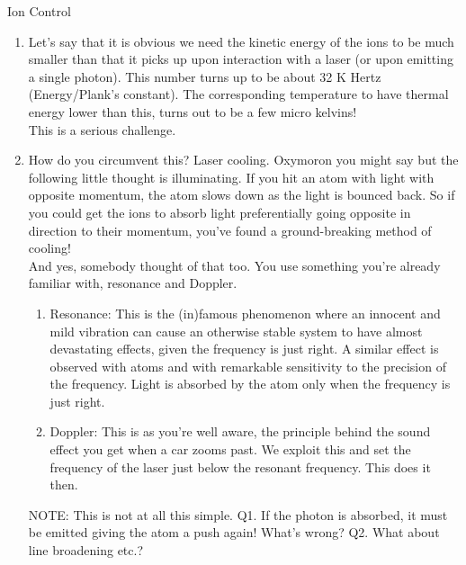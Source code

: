 \documentclass[final,hyperref={pdfpagelabels=false}]{beamer}
\begin{document}
\begin{frame}[t]
\begin{columns}[t]
\begin{column}{.465\textwidth}
\begin{block}{Ion Control}
	\begin{enumerate}
		\item Let's say that it is obvious we need the kinetic energy of the ions
		to be much smaller than that it picks up upon interaction with a laser
		(or upon emitting a single photon). This number turns up to be about
		32 K Hertz (Energy/Plank's constant). The corresponding temperature
		to have thermal energy lower than this, turns out to be a few micro
		kelvins!\\
		This is a serious challenge.
		\item How do you circumvent this? Laser cooling. Oxymoron you might say
		but the following little thought is illuminating. If you hit an atom
		with light with opposite momentum, the atom slows down as the light
		is bounced back. So if you could get the ions to absorb light preferentially
		going opposite in direction to their momentum, you've found a ground-breaking
		method of cooling!\\
		And yes, somebody thought of that too. You use something you're already
		familiar with, resonance and Doppler.

		\begin{enumerate}
			\item Resonance: This is the (in)famous phenomenon where an innocent and
			mild vibration can cause an otherwise stable system to have almost
			devastating effects, given the frequency is just right. A similar
			effect is observed with atoms and with remarkable sensitivity to the
			precision of the frequency. Light is absorbed by the atom only when
			the frequency is just right.
			\item Doppler: This is as you're well aware, the principle behind the sound
			effect you get when a car zooms past. We exploit this and set the
			frequency of the laser just below the resonant frequency. This does
			it then.\\		
		\end{enumerate}
		NOTE: This is not at all this simple. Q1. If the photon is absorbed,
		it must be emitted giving the atom a push again! What's wrong? Q2.
		What about line broadening etc.?		
	\end{enumerate}

\end{block}


\end{column}
\end{columns}
\end{frame}
\end{document}
